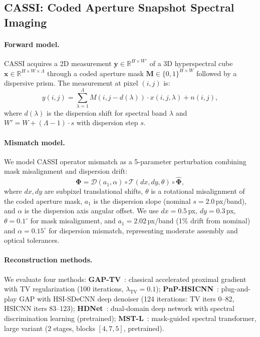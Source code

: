 \documentclass[runningheads]{llncs}
\begin{document}
\subsection{CASSI: Coded Aperture Snapshot Spectral Imaging}
\label{sec:cassi}

\paragraph{Forward model.}
CASSI acquires a 2D measurement $\mathbf{y} \in \mathbb{R}^{H \times W'}$ of a 3D hyperspectral cube $\mathbf{x} \in \mathbb{R}^{H \times W \times \Lambda}$ through a coded aperture mask $\mathbf{M} \in \{0,1\}^{H \times W}$ followed by a dispersive prism.
The measurement at pixel $(i, j)$ is:
\begin{equation}
    y(i, j) = \sum_{\lambda=1}^{\Lambda} M(i, j - d(\lambda)) \cdot x(i, j, \lambda) + n(i, j),
    \label{eq:cassi_forward}
\end{equation}
where $d(\lambda)$ is the dispersion shift for spectral band $\lambda$ and $W' = W + (\Lambda - 1) \cdot s$ with dispersion step $s$.

\paragraph{Mismatch model.}
We model CASSI operator mismatch as a 5-parameter perturbation combining mask misalignment and dispersion drift:
\begin{equation}
    \mathbf{\Phi} = \mathcal{D}(a_1, \alpha) \circ \mathcal{T}(dx, dy, \theta) \circ \hat{\mathbf{\Phi}},
\end{equation}
where $dx, dy$ are subpixel translational shifts, $\theta$ is a rotational misalignment of the coded aperture mask, $a_1$ is the dispersion slope (nominal $s = 2.0$\,px/band), and $\alpha$ is the dispersion axis angular offset.
We use $dx = 0.5$\,px, $dy = 0.3$\,px, $\theta = 0.1^\circ$ for mask misalignment, and $a_1 = 2.02$\,px/band (1\% drift from nominal) and $\alpha = 0.15^\circ$ for dispersion mismatch, representing moderate assembly and optical tolerances.

\paragraph{Reconstruction methods.}
We evaluate four methods:
\textbf{GAP-TV}~\cite{yuan2016gaptv}: classical accelerated proximal gradient with TV regularization (100 iterations, $\lambda_{\text{TV}} = 0.1$);
\textbf{PnP-HSICNN}~\cite{yuan2020pnp}: plug-and-play GAP with HSI-SDeCNN deep denoiser (124 iterations: TV iters 0--82, HSICNN iters 83--123);
\textbf{HDNet}~\cite{hu2022hdnet}: dual-domain deep network with spectral discrimination learning (pretrained);
\textbf{MST-L}~\cite{cai2022mst}: mask-guided spectral transformer, large variant (2 stages, blocks $[4,7,5]$, pretrained).
\end{document}
